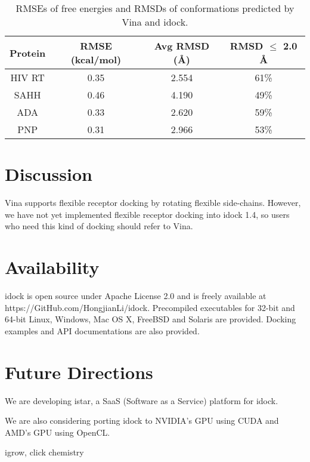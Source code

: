 \documentclass[10pt,conference,compsocconf]{../IEEEtran}
\begin{document}
\begin{table}
\centering
\begin{tabular*}
{\linewidth}
{@{\extracolsep{\fill}}cccc}
\toprule
Protein & RMSE (kcal/mol) & Avg RMSD (\AA) & RMSD $\leq$ 2.0 \AA\\
\midrule
HIV RT & 0.35 & 2.554 & 61\%\\
SAHH   & 0.46 & 4.190 & 49\%\\
ADA    & 0.33 & 2.620 & 59\%\\
PNP    & 0.31 & 2.966 & 53\%\\
\bottomrule
\end{tabular*}
\caption{RMSEs of free energies and RMSDs of conformations predicted by Vina and idock.}
\label{tab:RMSEAndRMSD}
\end{table}

\section{Discussion}

Vina supports flexible receptor docking by rotating flexible side-chains. However, we have not yet implemented flexible receptor docking into idock 1.4, so users who need this kind of docking should refer to Vina.

\section{Availability}

idock is open source under Apache License 2.0 and is freely available at https://GitHub.com/HongjianLi/idock. Precompiled executables for 32-bit and 64-bit Linux, Windows, Mac OS X, FreeBSD and Solaris are provided. Docking examples and API documentations are also provided.

\section{Future Directions}

We are developing istar, a SaaS (Software as a Service) platform for idock. 

We are also considering porting idock to NVIDIA's GPU using CUDA and AMD's GPU using OpenCL.

igrow, click chemistry



\end{document}

